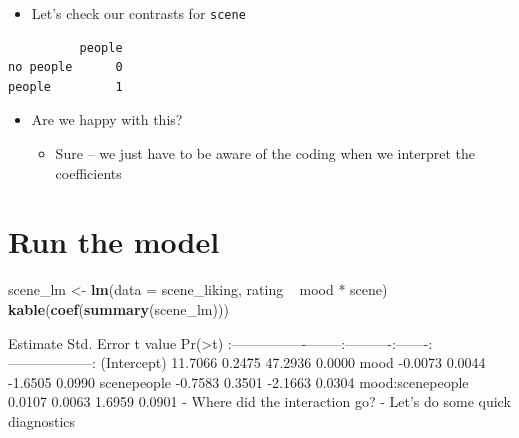 \documentclass[]{article}
\newenvironment{Shaded}{}{}
\newcommand{\KeywordTok}[1]{\textcolor[rgb]{0.00,0.44,0.13}{\textbf{{#1}}}}
\newcommand{\DataTypeTok}[1]{\textcolor[rgb]{0.56,0.13,0.00}{{#1}}}
\newcommand{\StringTok}[1]{\textcolor[rgb]{0.25,0.44,0.63}{{#1}}}
\newcommand{\NormalTok}[1]{{#1}}
\begin{document}
\begin{itemize}
\itemsep1pt\parskip0pt
\item
  Let's check our contrasts for \texttt{scene}
\end{itemize}

\begin{Shaded}
\end{Shaded}

\begin{verbatim}
          people
no people      0
people         1
\end{verbatim}

\begin{itemize}
\itemsep1pt\parskip0pt
\item
  Are we happy with this?

  \begin{itemize}
  \itemsep1pt\parskip0pt
  \item
    Sure -- we just have to be aware of the coding when we interpret the
    coefficients
  \end{itemize}
\end{itemize}

\section{Run the model}\label{run-the-model}

\begin{Shaded}
\begin{Highlighting}[]
\NormalTok{scene_lm <-}\StringTok{ }\KeywordTok{lm}\NormalTok{(}\DataTypeTok{data =} \NormalTok{scene_liking, rating ~}\StringTok{ }\NormalTok{mood *}\StringTok{ }\NormalTok{scene)}
\KeywordTok{kable}\NormalTok{(}\KeywordTok{coef}\NormalTok{(}\KeywordTok{summary}\NormalTok{(scene_lm)))}
\end{Highlighting}
\end{Shaded}

\textbar{} \textbar{} Estimate\textbar{} Std. Error\textbar{} t
value\textbar{} Pr(\textgreater{}\textbar{}t\textbar{})\textbar{}
\textbar{}:----------------\textbar{}--------:\textbar{}----------:\textbar{}-------:\textbar{}------------------:\textbar{}
\textbar{}(Intercept) \textbar{} 11.7066\textbar{} 0.2475\textbar{}
47.2936\textbar{} 0.0000\textbar{} \textbar{}mood \textbar{}
-0.0073\textbar{} 0.0044\textbar{} -1.6505\textbar{} 0.0990\textbar{}
\textbar{}scenepeople \textbar{} -0.7583\textbar{} 0.3501\textbar{}
-2.1663\textbar{} 0.0304\textbar{} \textbar{}mood:scenepeople \textbar{}
0.0107\textbar{} 0.0063\textbar{} 1.6959\textbar{} 0.0901\textbar{} -
Where did the interaction go? - Let's do some quick diagnostics
\end{document}
